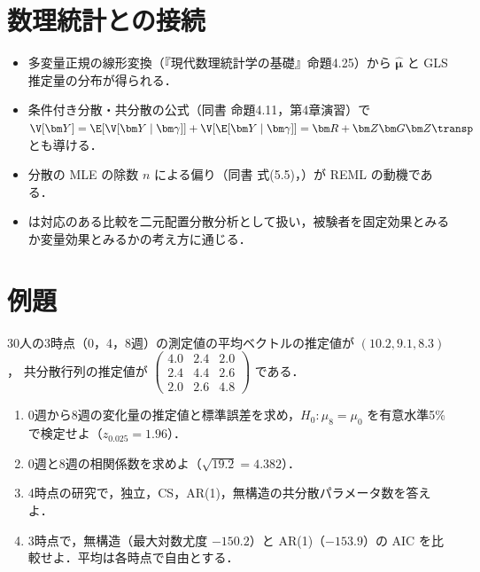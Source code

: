 \section{数理統計との接続}\label{sec:08-link}
\begin{linkbox}
\begin{itemize}
\item 多変量正規の線形変換（『現代数理統計学の基礎』命題4.25）から $\hat{\bm\mu}$ と GLS 推定量の分布が得られる．
\item 条件付き分散・共分散の公式（同書 命題4.11，第4章演習）で $\V[\bm Y]=\E[\V[\bm Y\mid\bm\gamma]]+\V[\E[\bm Y\mid\bm\gamma]]=\bm R+\bm Z\bm G\bm Z\transp$ とも導ける．
\item 分散の MLE の除数 $n$ による偏り（同書 式(5.5)，）が REML の動機である．
\item {} は対応のある比較を二元配置分散分析として扱い，被験者を固定効果とみるか変量効果とみるかの考え方に通じる．
\end{itemize}
\end{linkbox}

\section{例題}\label{sec:08-ex}
\begin{reidai}[反復測定]\label{reidai:08-1}
30人の3時点（0，4，8週）の測定値の平均ベクトルの推定値が $(10.2,9.1,8.3)$，
共分散行列の推定値が $\begin{pmatrix}4.0&2.4&2.0\\2.4&4.4&2.6\\2.0&2.6&4.8\end{pmatrix}$ である．
\begin{enumerate}[label=(\arabic*)]
\item 0週から8週の変化量の推定値と標準誤差を求め，$H_0:\mu_8=\mu_0$ を有意水準5\%で検定せよ（$z_{0.025}=1.96$）．
\item 0週と8週の相関係数を求めよ（$\sqrt{19.2}=4.382$）．
\item 4時点の研究で，独立，CS，AR(1)，無構造の共分散パラメータ数を答えよ．
\item 3時点で，無構造（最大対数尤度 $-150.2$）と AR(1)（$-153.9$）の AIC を比較せよ．平均は各時点で自由とする．
\end{enumerate}
\end{reidai}

